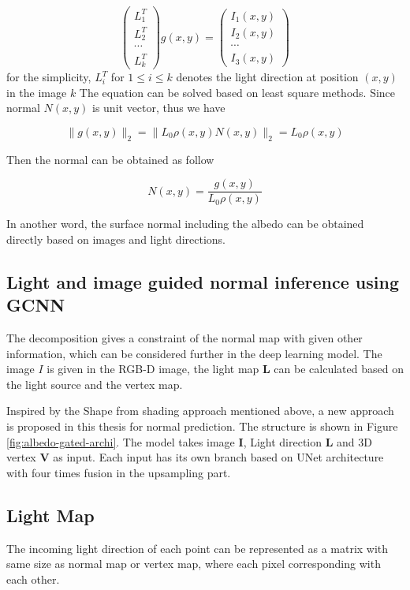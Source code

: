 \documentclass[]{article}
\begin{document}
\[ 
\begin{pmatrix}
	L_1^T \\
	L_2^T \\
	\cdots \\
	L_k^T
\end{pmatrix} g(x,y) = 
\begin{pmatrix}
	I_1(x,y) \\
	I_2(x,y) \\
	\cdots \\
	I_3(x,y)
\end{pmatrix}
\]
for the simplicity, $ L_i^T $ for $ 1\le i \le k $ denotes the light direction at position $ (x,y) $ in the image $ k $ 
The equation can be solved based on least square methods. 
Since normal $ N(x,y) $ is unit vector, thus we have 

\[ \|g(x,y)\|_2 = \|L_0\rho(x,y)N(x,y)\|_2 = L_0\rho(x,y) \]

Then the normal can be obtained as follow

\[  N(x,y) = \frac{g(x,y)}{L_0\rho(x,y)}\]

In another word, the surface normal including the albedo can be obtained directly based on images and light directions. 


\subsection{Light and image guided normal inference using GCNN}


The decomposition gives a constraint of the normal map with given other information, which can be considered further in the deep learning model. The image $ I $ is given in the RGB-D image, the light map $ \textbf{L} $ can be calculated based on the light source and the vertex map. 

Inspired by the Shape from shading approach mentioned above, a new approach is proposed in this thesis for normal prediction. The structure is shown in Figure \ref{fig:albedo-gated-archi}. The model takes image $ \textbf{I} $, Light direction $ \textbf{L} $ and 3D vertex $ \textbf{V} $ as input. Each input has its own branch based on UNet architecture with four times fusion in the upsampling part. 





\subsection{Light Map}
The incoming light direction of each point can be represented as a matrix with same size as normal map or vertex map, where each pixel corresponding with each other.
\end{document}
